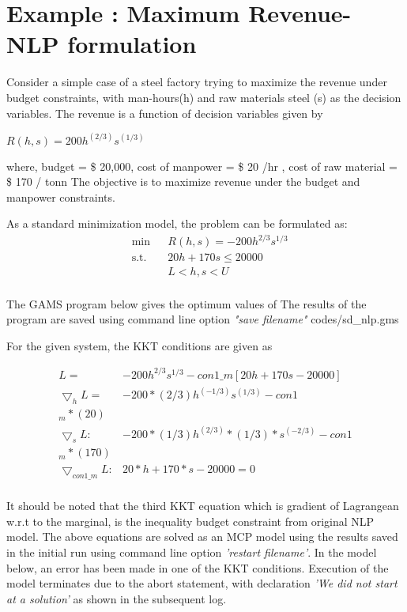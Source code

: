 \documentclass{article}
\begin{document}
\section{Example : Maximum Revenue- NLP formulation}

Consider a simple case of a steel factory trying to maximize the revenue under budget constraints, with man-hours(h) and
raw materials steel (s) as the decision variables. The revenue is a function of decision variables given by

\centerline{$R(h,s) = 200 h^{(2/3)}s^{(1/3)} $ }
\bigbreak
\noindent where, budget = \$ 20,000, cost of manpower = \$ 20 /hr , cost of raw material = \$ 170 / tonn
The objective is to maximize revenue under the budget and manpower constraints.

\noindent As a standard minimization model, the problem can be formulated as:
\begin{equation}
\begin{aligned}
&	\min
& & R(h,s) = - 200 h^{2/3}s^{1/3}  \\
& \text{s.t.} & & 	 20h + 170s \leq 20000 \\
& & &			L< h,s < U   \\
\end{aligned}
\end{equation}

The GAMS program below gives the optimum values of 
The results of the program are saved using command line option \textit{"save filename"}
 {codes/sd_nlp.gms}

\noindent For the given system, the KKT conditions are given as

\begin{equation}
\begin{aligned}
 L = & - 200 h^{2/3}s^{1/3} - con1\_m [ 20h + 170 s - 20000]	\\
 \bigtriangledown _h L = & - 200* (2/3) h^{(-1/3)}  s^{(1/3)} - con1\\_m*(20)  	\\
 \bigtriangledown _s L:  & - 200 * (1 / 3) h^{(2/3)} *(1/3) *  s^{(-2/3)} - con1\\_m*(170)   \\
 \bigtriangledown _{con1\_m} L : &   20*h + 170 * s - 20000 =0 \\
\end{aligned}
\end{equation}

\noindent It should be noted that the third KKT equation which is gradient of Lagrangean w.r.t to the marginal, is the inequality budget
constraint from original NLP model. The above equations are solved as an MCP model using the results saved in the initial run using command line
option \textit{'restart filename'}.
In the model below, an error has been made in one of the KKT conditions. Execution of the model terminates due to the abort statement,
with declaration \textit{'We did not start at a solution'} as shown in the subsequent log.
\end{document}

